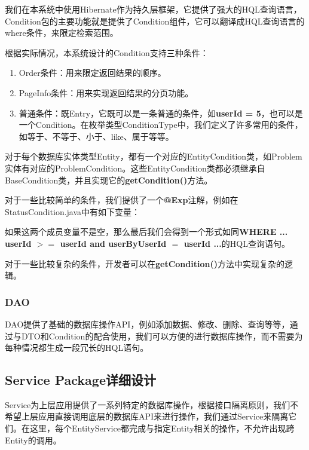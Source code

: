 我们在本系统中使用Hibernate作为持久层框架，它提供了强大的HQL查询语言，Condition包的主要功能就是提供了Condition组件，它可以翻译成HQL查询语言的where条件，来限定检索范围。

根据实际情况，本系统设计的Condition支持三种条件：
\begin{enumerate}
	\item Order条件：用来限定返回结果的顺序。
	\item PageInfo条件：用来实现返回结果的分页功能。
	\item 普通条件：既Entry，它既可以是一条普通的条件，如\textbf{userId = 5}，也可以是一个Condition。在枚举类型ConditionType中，我们定义了许多常用的条件，如等于、不等于、小于、like、属于等等。
\end{enumerate}

对于每个数据库实体类型Entity，都有一个对应的EntityCondition类，如Problem实体有对应的ProblemCondition。这些EntityCondition类都必须继承自BaseCondition类，并且实现它的\textbf{getCondition()}方法。

对于一些比较简单的条件，我们提供了一个\textbf{@Exp}注解，例如在StatusCondition.java中有如下变量：



如果这两个成员变量不是空，那么最后我们会得到一个形式如同\textbf{WHERE ... userId $>=$ userId and userByUserId $=$ userId ...}的HQL查询语句。

对于一些比较复杂的条件，开发者可以在\textbf{getCondition()}方法中实现复杂的逻辑。

\subsubsection{DAO}

DAO提供了基础的数据库操作API，例如添加数据、修改、删除、查询等等，通过与DTO和Condition的配合使用，我们可以方便的进行数据库操作，而不需要为每种情况都生成一段冗长的HQL语句。

\subsection{Service Package详细设计}

Service为上层应用提供了一系列特定的数据库操作，根据接口隔离原则\cite{szyperski2002component}，我们不希望上层应用直接调用底层的数据库API来进行操作，我们通过Service来隔离它们。在这里，每个EntityService都完成与指定Entity相关的操作，不允许出现跨Entity的调用。

